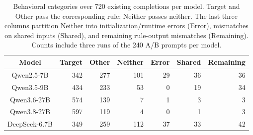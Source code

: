 \begin{table}[!htbp]
\centering
\caption{Behavioral categories over 720 existing completions per model. Target and Other pass the corresponding rule; Neither passes neither. The last three columns partition Neither into initialization/runtime errors (Error), mismatches on shared inputs (Shared), and remaining rule-output mismatches (Remaining). Counts include three runs of the 240 A/B prompts per model.}
\label{tab:representation-diagnosis}
\small
\setlength{\tabcolsep}{3pt}
\begin{tabular}{crrrrrr}
\toprule
Model & Target & Other & Neither & Error & Shared & Remaining \\
\midrule
Qwen2.5-7B & 342 & 277 & 101 & 29 & 36 & 36 \\
Qwen3.5-9B & 434 & 233 & 53 & 0 & 19 & 34 \\
Qwen3.6-27B & 574 & 139 & 7 & 1 & 3 & 3 \\
Qwen3.8-27B & 597 & 119 & 4 & 0 & 1 & 3 \\
DeepSeek-6.7B & 349 & 259 & 112 & 37 & 33 & 42 \\
\bottomrule
\end{tabular}
\end{table}
